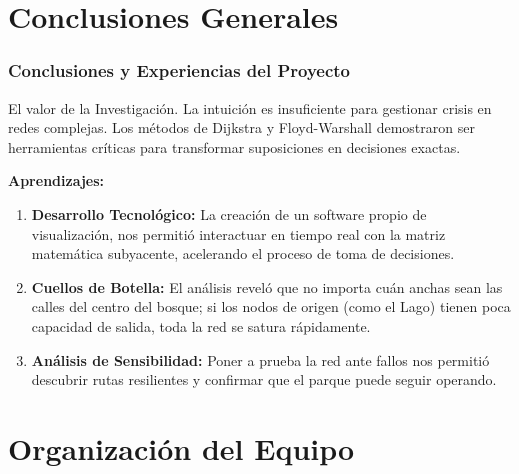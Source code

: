 \documentclass[aspectratio=169]{beamer}
\begin{document}
\section{Conclusiones Generales}

\begin{frame}
    \frametitle{Conclusiones y Experiencias del Proyecto}
    \begin{block}{El valor de la Investigación.}
        La intuición es insuficiente para gestionar crisis en redes complejas. 
        Los métodos de Dijkstra y Floyd-Warshall demostraron ser herramientas 
        críticas para transformar suposiciones en decisiones exactas.
    \end{block}
    
    \vspace{2mm}
    \textbf{Aprendizajes:}
    \begin{enumerate}
        \item \textbf{Desarrollo Tecnológico:} La creación de un software propio de visualización, nos permitió interactuar en tiempo real con la matriz matemática subyacente, acelerando el proceso de toma de decisiones.
        \item \textbf{Cuellos de Botella:} El análisis reveló que no importa cuán anchas sean las calles del centro del bosque; si los nodos de origen (como el Lago) tienen poca capacidad de salida, toda la red se satura rápidamente.
        \item \textbf{Análisis de Sensibilidad:} Poner a prueba la red ante fallos nos permitió descubrir rutas resilientes y confirmar que el parque puede seguir operando.
    \end{enumerate}
\end{frame}



\section{Organización del Equipo}
\end{document}

